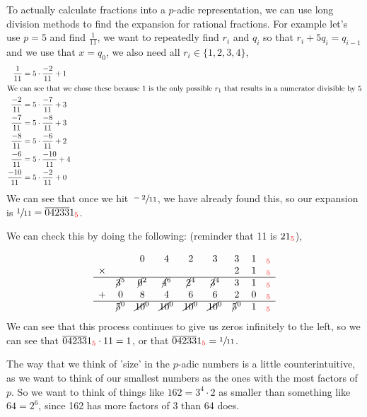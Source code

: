 \documentclass[11pt]{article}
\newcommand*\inb[1]{_{\textcolor{red}{#1}}}
\newcommand{\padic}{$p$-adic }
\begin{document}
To actually calculate fractions into a \padic representation, we can use long division methods to find the expansion for rational fractions. For example let's use $p=5$ and find $\frac{1}{11}$, we want to repeatedly find $r_i$ and $q_i$ so that $r_i+5q_i=q_{i-1}$ and we use that $x=q_0$, we also need all $r_i\in\{1,2,3,4\}$,
\begin{align*}
  \frac{1}{11}   & = 5 \cdot \frac{-2}{11} + 1 \\
  \intertext{We can see that we chose these because 1 is the only possible $r_1$ that results in a numerator divisible by 5}
  \frac{-2}{11}  & = 5 \cdot \frac{-7}{11} + 3 \\
  \frac{-7}{11}  & = 5\cdot \frac{-8}{11} + 3  \\
  \frac{-8}{11}  & = 5\cdot \frac{-6}{11} + 2  \\
  \frac{-6}{11}  & = 5\cdot \frac{-10}{11} + 4 \\
  \frac{-10}{11} & = 5\cdot \frac{-2}{11} + 0  \\
\end{align*}
We can see that once we hit $\sfrac{-2}{11}$, we have already found this, so our expansion is $\sfrac{1}{11}=\overline{04233}1\inb{5}$.


We can check this by doing the following: (reminder that 11 is $21\inb{5}$),

\[
  \begin{matrix}
    ~      & ~            & 0             & 4             & 2             & 3              & 3            & 1 & \inb{5} \\
    \times & ~            & ~             & ~             & ~             & ~              & 2            & 1 & \inb{5} \\
    \hline
    ~      & \cancel{3}^5 & \cancel{0}^2  & \cancel{4}^6  & \cancel{2}^4  & \cancel{3}^{4} & 3            & 1 & \inb{5} \\
    +      & 0            & 8             & 4             & 6             & 6              & 2            & 0 & \inb{5} \\
    \hline
    ~      & \cancel{5}^0 & \cancel{10}^0 & \cancel{10}^0 & \cancel{10}^0 & \cancel{10}^0  & \cancel{5}^0 & 1 & \inb{5} \\
  \end{matrix}
\]
We can see that this process continues to give us zeros infinitely to the left, so we can see that $\overline{04233}1\inb{5} \cdot 11=1$, or that $\overline{04233}1\inb{5}=\sfrac{1}{11}$.


The way that we think of 'size' in the \padic numbers is a little counterintuitive, as we want to think of our smallest numbers as the ones with the most factors of $p$. So we want to think of things like $162=3^4\cdot 2$ as smaller than something like $64=2^6$, since 162 has more factors of 3 than 64 does.
\end{document}
